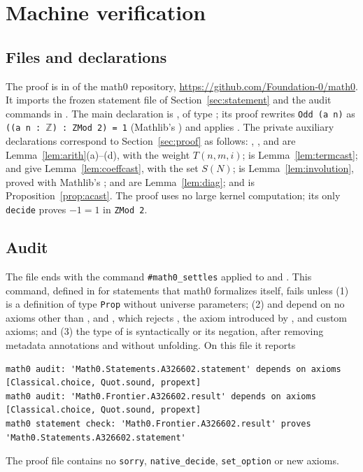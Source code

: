 \documentclass[11pt]{amsart}
\theoremstyle{plain}
\theoremstyle{definition}
\begin{document}
\section{Machine verification}\label{sec:lean}

\subsection*{Files and declarations}
The proof is in  of the math0 repository, \url{https://github.com/Foundation-0/math0}. It imports the frozen statement file of Section~\ref{sec:statement} and the audit commands in . The main declaration is , of type ; its proof rewrites \texttt{Odd (a n)} as \texttt{((a n : $\mathbb{Z}$) : ZMod 2) = 1} (Mathlib's ) and applies . The private auxiliary declarations correspond to Section~\ref{sec:proof} as follows: , ,  and  are Lemma~\ref{lem:arith}(a)--(d), with  the weight $T(n,m,i)$;  is Lemma~\ref{lem:termcast};  and  give Lemma~\ref{lem:coeffcast}, with  the set $S(N)$;  is Lemma~\ref{lem:involution}, proved with Mathlib's ;  and  are Lemma~\ref{lem:diag}; and  is Proposition~\ref{prop:acast}. The proof uses no large kernel computation; its only \texttt{decide} proves $-1=1$ in \texttt{ZMod 2}.

\subsection*{Audit}
The file ends with the command \texttt{\#math0\_settles} applied to  and . This command, defined in  for statements that math0 formalizes itself, fails unless (1)  is a definition of type \texttt{Prop} without universe parameters; (2)  and  depend on no axioms other than ,  and , which rejects , the axiom  introduced by , and custom axioms; and (3) the type of  is syntactically  or its negation, after removing metadata annotations and without unfolding. On this file it reports
\begin{lstlisting}[basicstyle=\ttfamily\scriptsize]
math0 audit: 'Math0.Statements.A326602.statement' depends on axioms [Classical.choice, Quot.sound, propext]
math0 audit: 'Math0.Frontier.A326602.result' depends on axioms [Classical.choice, Quot.sound, propext]
math0 statement check: 'Math0.Frontier.A326602.result' proves 'Math0.Statements.A326602.statement'
\end{lstlisting}The proof file contains no \texttt{sorry}, \texttt{native\_decide}, \texttt{set\_option} or new axioms.
\end{document}

